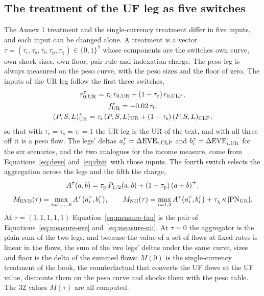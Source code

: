 \subsection{The treatment of the UF leg as five switches}
\label{sec:method-switches}

The Annex 1 treatment and the single-currency treatment differ in five inputs, and each input can be changed alone. A treatment is a vector $\tau=(\tau_{\mathrm{c}},\tau_{\mathrm{s}},\tau_{\mathrm{f}},\tau_{\mathrm{p}},\tau_{\chi})\in\{0,1\}^5$ whose components are the switches own curve, own shock sizes, own floor, pair rule and indexation charge. The peso leg is always measured on the peso curve, with the peso sizes and the floor of zero. The inputs of the UR leg follow the first three switches,
\begin{equation}
\begin{gathered}
r_{0,\mathrm{UR}}^{\tau}=\tau_{\mathrm{c}}\,r_{0,\mathrm{UR}}+(1-\tau_{\mathrm{c}})\,r_{0,\mathrm{CLP}},\\
f_{\mathrm{UR}}^{\tau}=-0.02\,\tau_{\mathrm{f}},\\
(P,S,L)_{\mathrm{UR}}^{\tau}=\tau_{\mathrm{s}}\,(P,S,L)_{\mathrm{UR}}+(1-\tau_{\mathrm{s}})\,(P,S,L)_{\mathrm{CLP}},
\end{gathered}
\label{eq:treated-inputs}
\end{equation}
so that with $\tau_{\mathrm{c}}=\tau_{\mathrm{s}}=\tau_{\mathrm{f}}=1$ the UR leg is the UR of the text, and with all three off it is a peso flow. The legs' deltas $a_i^{\tau}=\Delta\mathrm{EVE}_{i,\mathrm{CLP}}$ and $b_i^{\tau}=\Delta\mathrm{EVE}_{i,\mathrm{UR}}^{\tau}$ for the six scenarios, and the two analogues for the income measure, come from Equations~\eqref{eq:deve} and~\eqref{eq:dnii} with those inputs. The fourth switch selects the aggregation across the legs and the fifth the charge,
\begin{equation}
A^{\tau}(a,b)=\tau_{\mathrm{p}}\,P_{1/2}(a,b)+(1-\tau_{\mathrm{p}})\,{(a+b)}^{+},
\label{eq:aggregator}
\end{equation}
\begin{equation}
M_{\mathrm{EVE}}(\tau)=\max_{i=1,\dots,6}A^{\tau}\bigl(a_i^{\tau},b_i^{\tau}\bigr),\qquad
M_{\mathrm{NII}}(\tau)=\max_{i=1,2}A^{\tau}\bigl(a_i^{\tau},b_i^{\tau}\bigr)+\tau_{\chi}\,\kappa\,|\mathrm{PN}_{\mathrm{UR}}|.
\label{eq:measure-tau}
\end{equation}
At $\tau=(1,1,1,1,1)$ Equation~\eqref{eq:measure-tau} is the pair of Equations~\eqref{eq:measure-eve} and~\eqref{eq:measure-nii}. At $\tau=0$ the aggregator is the plain sum of the two legs, and because the value of a set of flows at fixed rates is linear in the flows, the sum of the two legs' deltas under the same curve, sizes and floor is the delta of the summed flows: $M(0)$ is the single-currency treatment of the book, the counterfactual that converts the UF flows at the UF value, discounts them on the peso curve and shocks them with the peso table. The 32 values $M(\tau)$ are all computed.

